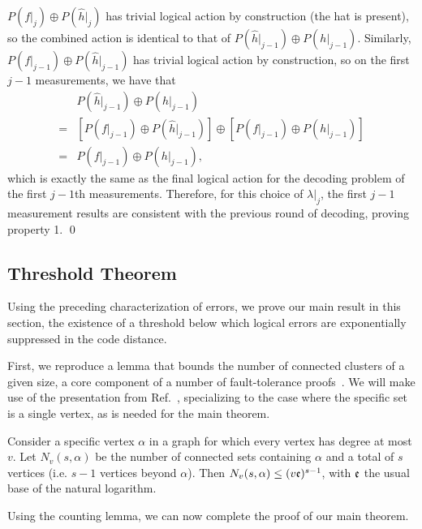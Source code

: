$P(f|_j)\oplus P(\hat{h}|_j)$ has trivial logical action by construction (the hat is present), so the combined action is identical to that of $P(\hat{h}|_{j-1})\oplus P(h|_{j-1})$.
%
Similarly, $P(f|_{j-1})\oplus P(\hat{h}|_{j-1})$ has trivial logical action by construction, so on the first $j-1$ measurements, we have that
\begin{align}
&P(\hat{h}|_{j-1})\oplus P(h|_{j-1})\nonumber\\=&[P(f|_{j-1})\oplus P(\hat{h}|_{j-1})]\oplus [P(f|_{j-1})\oplus P(h|_{j-1})]\nonumber\\
=&P(f|_{j-1})\oplus P(h|_{j-1}),
\end{align}
which is exactly the same as the final logical action for the decoding problem of the first $j-1$th measurements.
%
Therefore, for this choice of $\lambda|_j$, the first $j-1$ measurement results are consistent with the previous round of decoding, proving property 1.
\qed

\subsection{Threshold Theorem}
\label{si_sec:threshold}

Using the preceding characterization of errors, we prove our main result in this section, the existence of a threshold below which logical errors are exponentially suppressed in the code distance.

First, we reproduce a lemma that bounds the number of connected clusters of a given size, a core component of a number of fault-tolerance proofs~\cite{aliferis2007accuracy,bombin2015single,kovalev2013fault,gottesman2013fault,kubica2022single}.
%
We will make use of the presentation from Ref.~\cite{gottesman2013fault}, specializing to the case where the specific set is a single vertex, as is needed for the main theorem.

\begin{lemma}
\label{lemma:counting}
Consider a specific vertex $\alpha$ in a graph for which every vertex has degree at most $v$.
%
Let $N_v(s,\alpha)$ be the number of connected sets containing $\alpha$ and a total of $s$ vertices (i.e. $s-1$ vertices beyond $\alpha$).
%
Then \mbox{$N_v(s,\alpha)\leq(v\mathfrak{e})^{s-1}$}, with $\mathfrak{e}$ the usual base of the natural logarithm.
\end{lemma}

Using the counting lemma, we can now complete the proof of our main theorem.

